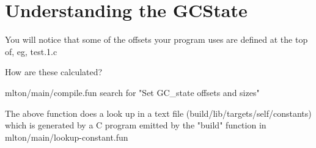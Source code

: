 \section{Understanding the GCState}
\label{gcstate}

You will notice that some of the offsets your program uses
are defined at the top of, eg, test.1.c

How are these calculated?

mlton/main/compile.fun search for "Set GC\_state offsets and sizes"

The above function does a look up in a text file (build/lib/targets/self/constants) which is generated by a C program emitted by the "build" function in mlton/main/lookup-constant.fun




